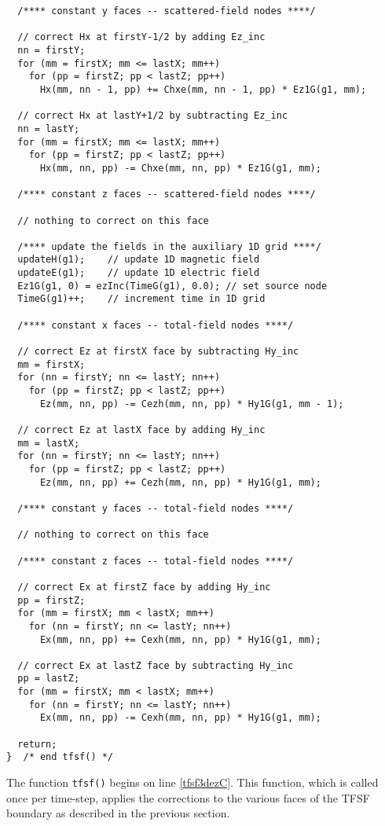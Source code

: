 \begin{program}
\begin{lstlisting}
  /**** constant y faces -- scattered-field nodes ****/

  // correct Hx at firstY-1/2 by adding Ez_inc
  nn = firstY;
  for (mm = firstX; mm <= lastX; mm++)
    for (pp = firstZ; pp < lastZ; pp++)
      Hx(mm, nn - 1, pp) += Chxe(mm, nn - 1, pp) * Ez1G(g1, mm);

  // correct Hx at lastY+1/2 by subtracting Ez_inc
  nn = lastY;
  for (mm = firstX; mm <= lastX; mm++)
    for (pp = firstZ; pp < lastZ; pp++)
      Hx(mm, nn, pp) -= Chxe(mm, nn, pp) * Ez1G(g1, mm);

  /**** constant z faces -- scattered-field nodes ****/

  // nothing to correct on this face

  /**** update the fields in the auxiliary 1D grid ****/
  updateH(g1);    // update 1D magnetic field
  updateE(g1);    // update 1D electric field
  Ez1G(g1, 0) = ezInc(TimeG(g1), 0.0); // set source node
  TimeG(g1)++;    // increment time in 1D grid

  /**** constant x faces -- total-field nodes ****/

  // correct Ez at firstX face by subtracting Hy_inc
  mm = firstX;
  for (nn = firstY; nn <= lastY; nn++)
    for (pp = firstZ; pp < lastZ; pp++)
      Ez(mm, nn, pp) -= Cezh(mm, nn, pp) * Hy1G(g1, mm - 1);

  // correct Ez at lastX face by adding Hy_inc
  mm = lastX;
  for (nn = firstY; nn <= lastY; nn++)
    for (pp = firstZ; pp < lastZ; pp++)
      Ez(mm, nn, pp) += Cezh(mm, nn, pp) * Hy1G(g1, mm);

  /**** constant y faces -- total-field nodes ****/

  // nothing to correct on this face

  /**** constant z faces -- total-field nodes ****/

  // correct Ex at firstZ face by adding Hy_inc
  pp = firstZ;
  for (mm = firstX; mm < lastX; mm++)
    for (nn = firstY; nn <= lastY; nn++)
      Ex(mm, nn, pp) += Cexh(mm, nn, pp) * Hy1G(g1, mm);

  // correct Ex at lastZ face by subtracting Hy_inc
  pp = lastZ;
  for (mm = firstX; mm < lastX; mm++)
    for (nn = firstY; nn <= lastY; nn++)
      Ex(mm, nn, pp) -= Cexh(mm, nn, pp) * Hy1G(g1, mm);

  return;
}  /* end tfsf() */
\end{lstlisting}
\end{program}

The function {\tt tfsf()} begins on line \ref{tfsf3dezC}.  This
function, which is called once per time-step, applies the corrections
to the various faces of the TFSF boundary as described in the previous
section.

